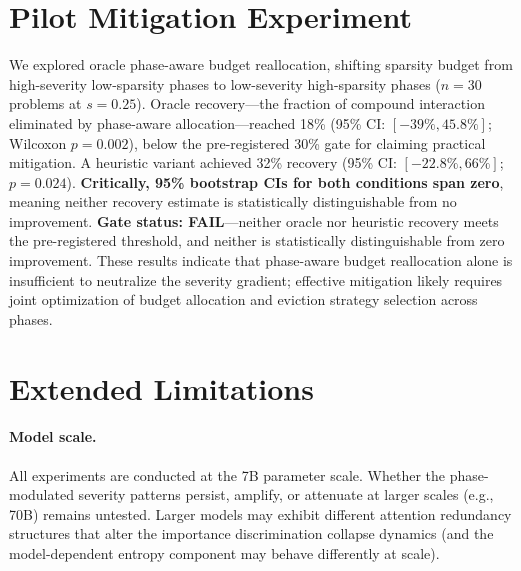 \section{Pilot Mitigation Experiment}
\label{app:pilot-mitigation}

We explored oracle phase-aware budget reallocation, shifting sparsity budget from high-severity low-sparsity phases to low-severity high-sparsity phases ($n{=}30$ problems at $s{=}0.25$). Oracle recovery---the fraction of compound interaction eliminated by phase-aware allocation---reached 18\% (95\% CI: $[-39\%, 45.8\%]$; Wilcoxon $p = 0.002$), below the pre-registered 30\% gate for claiming practical mitigation. A heuristic variant achieved 32\% recovery (95\% CI: $[-22.8\%, 66\%]$; $p = 0.024$). \textbf{Critically, 95\% bootstrap CIs for both conditions span zero}, meaning neither recovery estimate is statistically distinguishable from no improvement. \textbf{Gate status: FAIL}---neither oracle nor heuristic recovery meets the pre-registered threshold, and neither is statistically distinguishable from zero improvement. These results indicate that phase-aware budget reallocation alone is insufficient to neutralize the severity gradient; effective mitigation likely requires joint optimization of budget allocation and eviction strategy selection across phases.


\section{Extended Limitations}
\label{app:limitations}

\paragraph{Model scale.}
All experiments are conducted at the 7B parameter scale.
Whether the phase-modulated severity patterns persist, amplify, or attenuate at larger scales (e.g., 70B) remains untested.
Larger models may exhibit different attention redundancy structures that alter the importance discrimination collapse dynamics (and the model-dependent entropy component may behave differently at scale).


